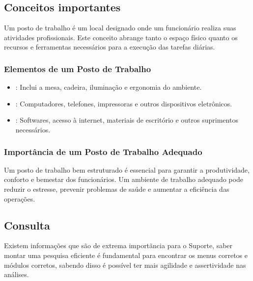 \documentclass[letterpaper,10pt,portuges]{sphinxmanual}
\begin{document}
\sphinxstepscope


\subsection{Conceitos importantes}
\label{\detokenize{conceitos:conceitos-importantes}}\label{\detokenize{conceitos::doc}}
\sphinxAtStartPar
Um posto de trabalho é um local designado onde um funcionário realiza suas atividades profissionais. Este conceito abrange tanto o espaço físico quanto os recursos e ferramentas necessários para a execução das tarefas diárias.


\subsubsection{Elementos de um Posto de Trabalho}
\label{\detokenize{conceitos:elementos-de-um-posto-de-trabalho}}\begin{itemize}
\item {} 
\sphinxAtStartPar
{}: Inclui a mesa, cadeira, iluminação e ergonomia do ambiente.

\item {} 
\sphinxAtStartPar
{}: Computadores, telefones, impressoras e outros dispositivos eletrônicos.

\item {} 
\sphinxAtStartPar
{}: Softwares, acesso à internet, materiais de escritório e outros suprimentos necessários.

\end{itemize}


\subsubsection{Importância de um Posto de Trabalho Adequado}
\label{\detokenize{conceitos:importancia-de-um-posto-de-trabalho-adequado}}
\sphinxAtStartPar
Um posto de trabalho bem estruturado é essencial para garantir a produtividade, conforto e bem\sphinxhyphen{}estar dos funcionários. Um ambiente de trabalho adequado pode reduzir o estresse, prevenir problemas de saúde e aumentar a eficiência das operações.

\noindent{}

\sphinxstepscope


\subsection{Consulta}
\label{\detokenize{Consulta:consulta}}\label{\detokenize{Consulta::doc}}
\sphinxAtStartPar
Existem informações que são de extrema importãncia para o Suporte,
saber montar uma pesquisa eficiente é fundamental para encontrar os
menus corretos e módulos corretos, sabendo disso é possível ter mais
agilidade e assertividade nas análises.

\noindent{}



\renewcommand{\indexname}{Índice}
\printindex
\end{document}

